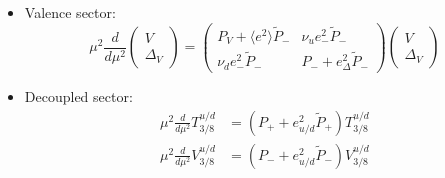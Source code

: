 \documentclass[a4paper,oneside]{article}
\begin{document}
\begin{itemize}
\item Valence sector:
\begin{equation*}
\mu^2\frac{d}{d\mu^2}
\begin{pmatrix}
V \\
\Delta_V
\end{pmatrix}
=
\begin{pmatrix}
P_V+\langle e^2\rangle \tilde{P}_{-} & \nu_ue^2_-\tilde{P}_{-}\\
 \nu_de^2_-\tilde{P}_{-}& P_-+e_\Delta^2 \tilde{P}_{-}
\end{pmatrix}
\begin{pmatrix}
V \\
\Delta_V
\end{pmatrix}
\end{equation*}
\item Decoupled sector:
\begin{align*}
\mu^2\frac{d}{d\mu^2}T^{u/d}_{3/8} & = (P_{+} + e_{u/d}^2 \tilde{P}_{+}) T^{u/d}_{3/8} \\
\mu^2\frac{d}{d\mu^2}V^{u/d}_{3/8} & = (P_{-} + e_{u/d}^2 \tilde{P}_{-} )V^{u/d}_{3/8}
\end{align*}
\end{itemize}
\end{document}
